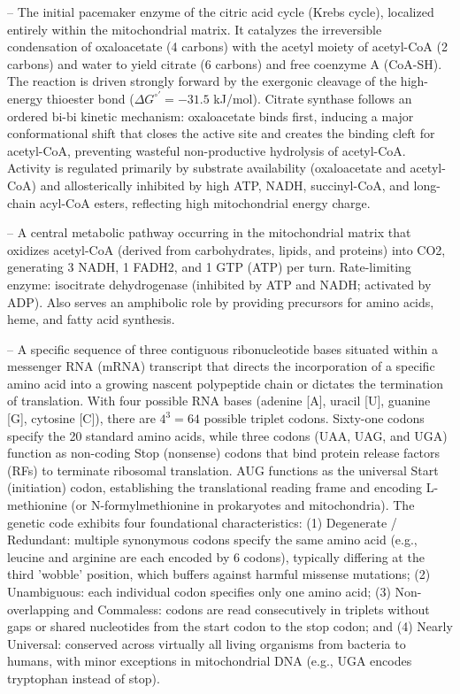-- The initial pacemaker enzyme of the citric acid cycle (Krebs cycle), localized entirely within the mitochondrial matrix. It catalyzes the irreversible condensation of oxaloacetate (4 carbons) with the acetyl moiety of acetyl-CoA (2 carbons) and water to yield citrate (6 carbons) and free coenzyme A (CoA-SH). The reaction is driven strongly forward by the exergonic cleavage of the high-energy thioester bond ($\Delta G^{\circ\prime} = -31.5$ kJ/mol). Citrate synthase follows an ordered bi-bi kinetic mechanism: oxaloacetate binds first, inducing a major conformational shift that closes the active site and creates the binding cleft for acetyl-CoA, preventing wasteful non-productive hydrolysis of acetyl-CoA. Activity is regulated primarily by substrate availability (oxaloacetate and acetyl-CoA) and allosterically inhibited by high ATP, NADH, succinyl-CoA, and long-chain acyl-CoA esters, reflecting high mitochondrial energy charge.

-- A central metabolic pathway occurring in the mitochondrial matrix that oxidizes acetyl-CoA (derived from carbohydrates, lipids, and proteins) into CO2, generating 3 NADH, 1 FADH2, and 1 GTP (ATP) per turn. Rate-limiting enzyme: isocitrate dehydrogenase (inhibited by ATP and NADH; activated by ADP). Also serves an amphibolic role by providing precursors for amino acids, heme, and fatty acid synthesis.

-- A specific sequence of three contiguous ribonucleotide bases situated within a messenger RNA (mRNA) transcript that directs the incorporation of a specific amino acid into a growing nascent polypeptide chain or dictates the termination of translation. With four possible RNA bases (adenine [A], uracil [U], guanine [G], cytosine [C]), there are $4^3 = 64$ possible triplet codons. Sixty-one codons specify the 20 standard amino acids, while three codons (UAA, UAG, and UGA) function as non-coding Stop (nonsense) codons that bind protein release factors (RFs) to terminate ribosomal translation. AUG functions as the universal Start (initiation) codon, establishing the translational reading frame and encoding L-methionine (or N-formylmethionine in prokaryotes and mitochondria). The genetic code exhibits four foundational characteristics: (1) Degenerate / Redundant: multiple synonymous codons specify the same amino acid (e.g., leucine and arginine are each encoded by 6 codons), typically differing at the third 'wobble' position, which buffers against harmful missense mutations; (2) Unambiguous: each individual codon specifies only one amino acid; (3) Non-overlapping and Commaless: codons are read consecutively in triplets without gaps or shared nucleotides from the start codon to the stop codon; and (4) Nearly Universal: conserved across virtually all living organisms from bacteria to humans, with minor exceptions in mitochondrial DNA (e.g., UGA encodes tryptophan instead of stop).

